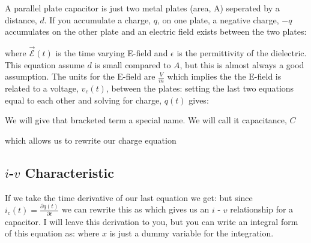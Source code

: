 \documentclass{handout}
\begin{document}
A parallel plate capacitor is just two metal plates (area, A) seperated by a distance, $d$.  If you accumulate a charge, $q$, on one plate, a negative charge, $-q$ accumulates on the other plate and an electric field exists between the two plates:

where $\vec{\mathcal{E}}(t)$ is the time varying E-field and $\epsilon$ is the permittivity of the dielectric.  This equation assume $d$ is small compared to $A$, but this is almost always a good assumption.  The units for the E-field are $\frac{V}{m}$ which implies the the E-field is related to a voltage, $v_c(t)$, between the plates:
setting the last two equations equal to each other and solving for charge, $q(t)$ gives:

We will give that bracketed term a special name.  We will call it capacitance, $C$


which allows us to rewrite our charge equation


\subsection{$i$-$v$ Characteristic}
If we take the time derivative of our last equation we get:
but since $i_c(t) = \frac{\partial q(t)}{\partial t}$ we can rewrite this as
which gives us an $i$ - $v$ relationship for a capacitor.  I will leave this derivation to you, but you can write an integral form of this equation as:
where $x$ is just a dummy variable for the integration.
\end{document}
